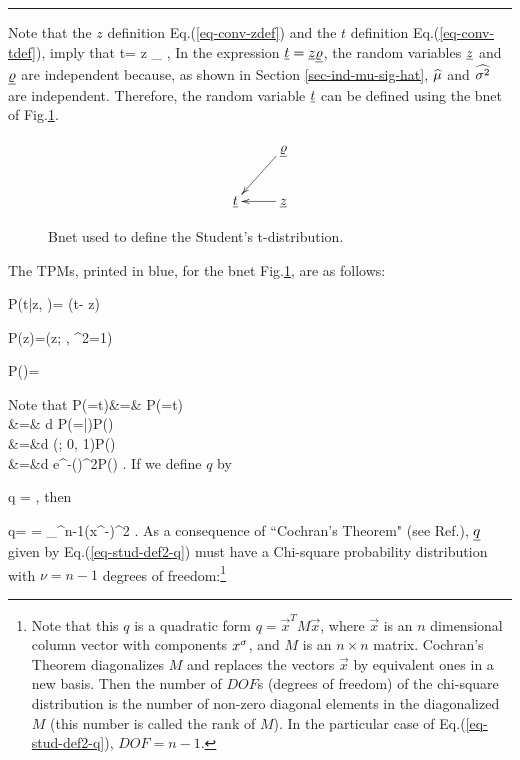 \hrule{}

Note that the $z$ definition
Eq.(\ref{eq-conv-zdef})
and the $t$ definition
Eq.(\ref{eq-conv-tdef}),
imply that
\beq
t= z
_{\varrho}
\;,
\eeq
In the
expression ${\underline{t}}={\underline{z}}\underline{\varrho}$,
the
 random variables
${\underline{z}}$ and $\underline{\varrho}$
are independent
because, as shown in Section
\ref{sec-ind-mu-sig-hat},
 ${\widehat{\mu}}$
and ${\widehat{\sigma^2}}$
are independent.
Therefore, the random variable ${\underline{t}}$
can be defined using the bnet
of Fig.\ref{fig-stud-bnet}.

\begin{figure}[h!]
$$
\xymatrix{
&\ul{\varrho}\ar[ld]
\\
\rvt&\rvz\ar[l]
}
$$
\caption{Bnet used to define
the Student's t-distribution.}
\label{fig-stud-bnet}
\end{figure}
The TPMs, printed in blue,
for the bnet Fig.\ref{fig-stud-bnet},
are as follows:

\beq\color{blue}
P(t|z, \varrho)=
\delta(t- z\varrho)
\;\;\;
\eeq

\beq\color{blue}
P(z)=\caln(z; , \s^2=1)
\eeq

\beq\color{blue}
P(\varrho)=
\eeq

Note that
\beqa
P(\rvt=t)&=&
P(\rvz\ul{\varrho}=t)
\\
&=&
\int d\varrho\;
P(\rvz=|\varrho)P(\varrho)
\\
&=&\int d\varrho\;
\caln(; 0, 1)P(\varrho)
\\
&=&\int d\varrho\;
e^{-\;()^2}P(\varrho)
\;.
\eeqa
If we define $q$ by

\beq
q =
\;,
\label{eq-stud-def1-q}
\eeq
then

\beq
q=
=
\sum_{}^{n-1}(x^\s-\HAT{\mu})^2
\;.
\label{eq-stud-def2-q}
\eeq
As a consequence of
``Cochran's Theorem"
(see Ref.\cite{wiki-coch-theo}),
${\underline{q}}$ given
by Eq.(\ref{eq-stud-def2-q}) must have
a Chi-square probability
distribution with $\nu=n-1$
degrees of freedom:\footnote{Note
that this $q$
is a quadratic form
$q=\vec{x}^T M \vec{x}$,
where $\vec{x}$ is an $n$ dimensional
column vector with components
$x^\sigma$,
and $M$ is an $n\times n$ matrix.
Cochran's Theorem
diagonalizes $M$
and replaces the
vectors $\vec{x}$
by equivalent ones in a new
basis.
Then the number
of $DOF$s (degrees of freedom)
of the chi-square distribution
is the number of non-zero
diagonal elements in
 the diagonalized $M$
(this
number is called the rank of $M$).
In the particular case of
Eq.(\ref{eq-stud-def2-q}),
$DOF=n-1$.}

